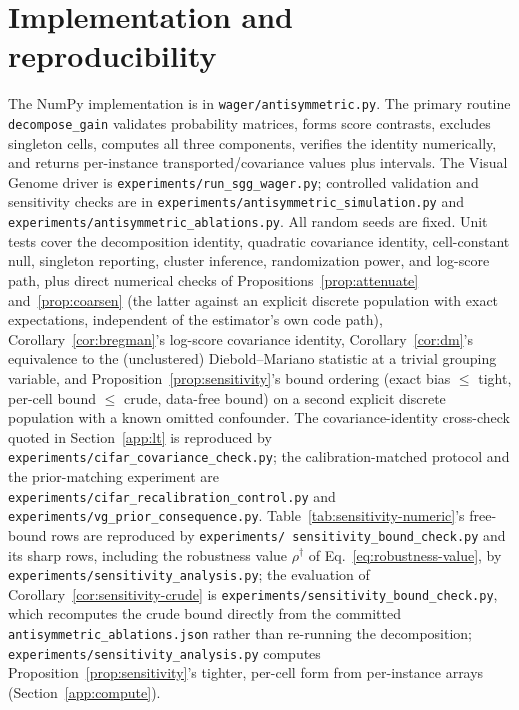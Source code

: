 \section{Implementation and reproducibility}\label{app:implementation}

The NumPy implementation is in \texttt{wager/antisymmetric.py}. The primary routine
\texttt{decompose\_gain} validates probability matrices, forms score contrasts, excludes
singleton cells, computes all three components, verifies the identity numerically, and
returns per-instance transported/covariance values plus intervals. The Visual Genome
driver is \texttt{experiments/\allowbreak run\_sgg\_wager.py}; controlled validation and sensitivity
checks are in \texttt{experiments/\allowbreak antisymmetric\_simulation.py} and
\texttt{experiments/\allowbreak antisymmetric\_ablations.py}. All random seeds are fixed. Unit tests
cover the decomposition identity, quadratic covariance identity, cell-constant null,
singleton reporting, cluster inference, randomization power, and log-score path, plus
direct numerical checks of Propositions~\ref{prop:attenuate} and~\ref{prop:coarsen}
(the latter against an explicit discrete population with exact expectations, independent
of the estimator's own code path), Corollary~\ref{cor:bregman}'s log-score covariance
identity, Corollary~\ref{cor:dm}'s equivalence to the (unclustered) Diebold--Mariano
statistic at a trivial grouping variable, and Proposition~\ref{prop:sensitivity}'s bound
ordering (exact bias $\le$ tight, per-cell bound $\le$ crude, data-free bound) on a second
explicit discrete population with a known omitted confounder. The covariance-identity
cross-check quoted in
Section~\ref{app:lt} is reproduced by
\texttt{experiments/\allowbreak cifar\_covariance\_check.py}; the calibration-matched
protocol and the prior-matching experiment are
\texttt{experiments/\allowbreak cifar\_recalibration\_control.py} and
\texttt{experiments/\allowbreak vg\_prior\_consequence.py}. Table~\ref{tab:sensitivity-numeric}'s
free-bound rows are reproduced by \texttt{experiments/\allowbreak
sensitivity\_bound\_check.py} and its sharp rows, including the robustness value
$\rho^\dagger$ of Eq.~\eqref{eq:robustness-value}, by
\texttt{experiments/\allowbreak sensitivity\_analysis.py}; the evaluation of
Corollary~\ref{cor:sensitivity-crude} is
\texttt{experiments/\allowbreak sensitivity\_bound\_check.py}, which recomputes the crude
bound directly from the committed \texttt{antisymmetric\_ablations.json} rather than
re-running the decomposition; \texttt{experiments/\allowbreak sensitivity\_analysis.py}
computes Proposition~\ref{prop:sensitivity}'s tighter, per-cell form from per-instance
arrays (Section~\ref{app:compute}).

